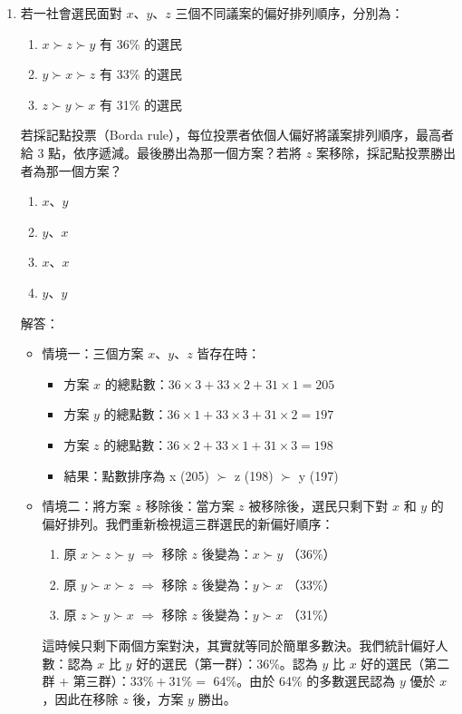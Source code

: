 \documentclass[12pt, a4paper]{article}
\begin{document}
\begin{enumerate}
    \item 若一社會選民面對 \(x\)、\(y\)、\(z\) 三個不同議案的偏好排列順序，分別為：
    \begin{enumerate}[label=\arabic*.]
        \item \(x \succ z \succ y\) 有 36\% 的選民
        \item \(y \succ x \succ z\) 有 33\% 的選民
        \item \(z \succ y \succ x\) 有 31\% 的選民
    \end{enumerate}
    若採記點投票（Borda rule），每位投票者依個人偏好將議案排列順序，最高者給 3 點，依序遞減。最後勝出為那一個方案？若將 \(z\) 案移除，採記點投票勝出者為那一個方案？
    \begin{enumerate}[label=\Alph*.]
        \item \(x\)、\(y\)
        \item \(y\)、\(x\)
        \item \(x\)、\(x\)
        \item \(y\)、\(y\)
    \end{enumerate}
    解答：
    \begin{itemize}
        \item 情境一：三個方案 \(x\)、\(y\)、\(z\) 皆存在時：
        \begin{itemize}
            \item 方案 \(x\) 的總點數：\(36 \times 3 + 33 \times 2 + 31 \times 1 = 205\)
            \item 方案 \(y\) 的總點數：$36 \times 1 + 33 \times 3 + 31 \times 2 = 197 $
            \item 方案 \(z\) 的總點數：$36 \times 2 + 33 \times 1 + 31 \times 3 = 198$
            \item 結果：點數排序為 x (205) $\succ$ z (198) $\succ$ y (197)
        \end{itemize}
        \item 情境二：將方案 \(z\) 移除後：當方案 \(z\) 被移除後，選民只剩下對 \(x\) 和 \(y\) 的偏好排列。我們重新檢視這三群選民的新偏好順序：
        \begin{enumerate}[1.]
            \item 原 \(x \succ z \succ y\) \(\Rightarrow\) 移除 \(z\) 後變為：\(x \succ y\) （36\%）
            \item 原 \(y \succ x \succ z\) \(\Rightarrow\) 移除 \(z\) 後變為：\(y \succ x\) （33\%）
            \item 原 \(z \succ y \succ x\) \(\Rightarrow\) 移除 \(z\) 後變為：\(y \succ x\) （31\%）
        \end{enumerate}
        這時候只剩下兩個方案對決，其實就等同於簡單多數決。我們統計偏好人數：認為 \(x\) 比 \(y\) 好的選民（第一群）：36\%。認為 \(y\) 比 \(x\) 好的選民（第二群 + 第三群）：\(33\% + 31\% =\) 64\%。由於 64\% 的多數選民認為 \(y\) 優於 \(x\)，因此在移除 \(z\) 後，方案 \(y\) 勝出。
    \end{itemize}


\end{enumerate}
\end{document}
